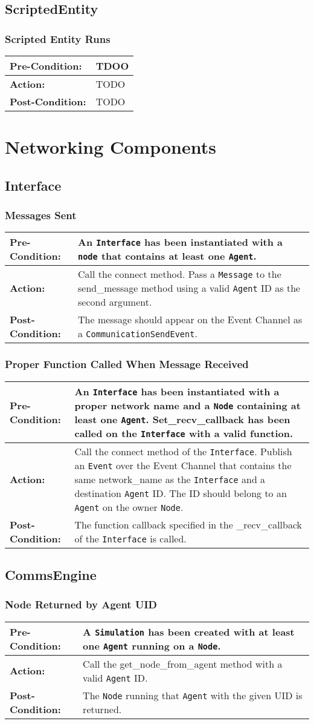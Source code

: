 \documentclass[titlepage]{article}
\newcommand{\testcase}[3]{
    \begin{center}
    \begin{tabular}{| l | p{0.7\textwidth}|}
        \hline
        \rowcolor[gray]{0.8}\textbf{Pre-Condition:} & #1 \\ \hline
        \textbf{Action:} & #2 \\ \hline
        \rowcolor[gray]{0.8}\textbf{Post-Condition:} & #3 \\ \hline
    \end{tabular}
    \end{center}
}
\begin{document}
\subsection{ScriptedEntity}
\subsubsection{Scripted Entity Runs}
\testcase{TDOO}{TODO}{TODO}


\section{Networking Components}
\subsection{Interface}
\subsubsection{Messages Sent}
\testcase{An \texttt{Interface} has been instantiated with a \texttt{node} that contains at least one
\texttt{Agent}.}{Call the connect method. Pass a \texttt{Message} to the send\_message method using a valid
\texttt{Agent} ID as the second argument.}{The message should appear on the Event Channel as a
\texttt{CommunicationSendEvent}.}

\subsubsection{Proper Function Called When Message Received}
\testcase{An \texttt{Interface} has been instantiated with a proper network name and a \texttt{Node} containing at least
one \texttt{Agent}. Set\_recv\_callback has been called on the \texttt{Interface} with a valid function.}{Call the connect method of the \texttt{Interface}.  Publish an \texttt{Event} over the Event
Channel that contains the same network\_name as the \texttt{Interface} and a destination \texttt{Agent} ID.  The ID
should belong to an \texttt{Agent} on the owner \texttt{Node}.}{The function callback specified in the \_recv\_callback
of the \texttt{Interface} is called.}

\subsection{CommsEngine}
\subsubsection{Node Returned by Agent UID}
\testcase{A \texttt{Simulation} has been created with at least one \texttt{Agent} running on a \texttt{Node}. }{Call the
get\_node\_from\_agent method with a valid \texttt{Agent} ID.}{The \texttt{Node} running that \texttt{Agent} with the
given UID is returned.}
\end{document}
